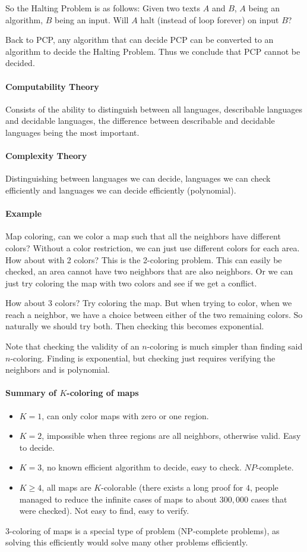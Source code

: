 \documentclass[12 pt]{article}
\begin{document}
So the Halting Problem is as follows: Given two texts $A$ and $B$, $A$
being an algorithm, $B$ being an input. Will $A$ halt (instead of loop
forever) on input $B$?

Back to PCP, any algorithm that can decide PCP can be converted to an
algorithm to decide the Halting Problem. Thus we conclude that PCP
cannot be decided.

\paragraph{Computability Theory}
Consists of the ability to distinguish between all languages,
describable languages and decidable languages, the difference between
describable and decidable languages being the most important.
\paragraph{Complexity Theory} Distinguishing between languages we can
decide, languages we can check efficiently and languages we can decide
efficiently (polynomial).
\paragraph{Example} Map coloring, can we color a map such that all the
neighbors have different colors? Without a color restriction, we can
just use different colors for each area. How about with 2 colors? This
is the 2-coloring problem. This can easily be checked, an area cannot
have two neighbors that are also neighbors. Or we can just try
coloring the map with two colors and see if we get a conflict.

How about 3 colors? Try coloring the map. But when trying to color,
when we reach a neighbor, we have a choice between either of the two
remaining colors. So naturally we should try both. Then checking this
becomes exponential.

Note that checking the validity of an $n$-coloring is much simpler
than finding said $n$-coloring. Finding is exponential, but checking
just requires verifying the neighbors and is polynomial.

\paragraph{Summary of $K$-coloring of maps}
\begin{itemize}
\item $K = 1$, can only color maps with zero or one region.
\item $K = 2$, impossible when three regions are all neighbors,
  otherwise valid. Easy to decide.
\item $K = 3$, no known efficient algorithm to decide, easy to check. $NP$-complete.
\item $K \geq 4$, all maps are $K$-colorable (there exists a long
  proof for $4$, people managed to reduce the infinite cases of maps
  to about $300,000$ cases that were checked). Not easy to find, easy
  to verify.
\end{itemize}
$3$-coloring of maps is a special type of problem (NP-complete
problems), as solving this efficiently would solve many other problems
efficiently.
\end{document}
